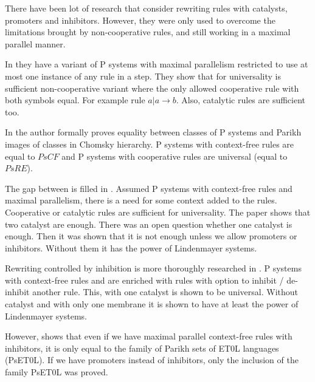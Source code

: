 \documentclass[a4paper,10pt]{article}
\begin{document}

There have been lot of research that consider rewriting rules with catalysts, promoters and inhibitors. However, they were only used to overcome the limitations brought by non-cooperative rules, and still working in a maximal parallel manner.


In \cite{Ibarra04dang} they have a variant of P systems with maximal parallelism restricted to use at most one instance of any rule in a step.
They show that for universality is sufficient non-cooperative variant where the only allowed cooperative rule with both symbols equal. For example rule $a|a\rightarrow b$. Also, catalytic rules are sufficient too.


In \cite{Sburlan05dragos} the author formally proves equality between classes of P systems and Parikh images of classes in Chomsky hierarchy. P systems with context-free rules are equal to $PsCF$ and P systems with cooperative rules are universal (equal to $PsRE$).


The gap between is filled in \cite{Ionescu:jucs_10_5:on_p_systems_with}. Assumed P systems with context-free rules and maximal parallelism, there is a need for some context added to the rules. Cooperative or catalytic rules are sufficient for universality. The paper shows that two catalyst are enough. There was an open question whether one catalyst is enough. Then it was shown that it is not enough unless we allow promoters or inhibitors. Without them it has the power of Lindenmayer systems.


Rewriting controlled by inhibition is more thoroughly researched in \cite{Cavaliere:2004:IRP:2144633.2144648}. P systems with context-free rules and are enriched with rules with option to inhibit / de-inhibit another rule. This, with one catalyst is shown to be universal. Without catalyst and with only one membrane it is shown to have at least the power of Lindenmayer systems.


However, \cite{doi:10.1142/S0129054106003772} shows that even if we have maximal parallel context-free rules with inhibitors, it is only equal to the family of Parikh sets of ET0L languages (PsET0L). If we have promoters instead of inhibitors, only the inclusion of the family PsET0L was proved. %
\end{document}
